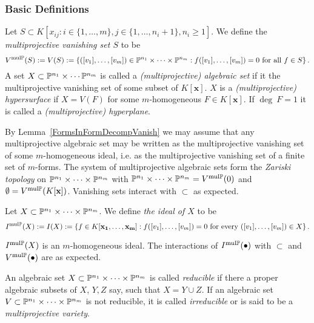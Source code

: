     \subsubsection{Basic Definitions}
        \begin{definition}
            Let $S\subset K[x_{ij} : i\in \{1,\dots,m\}, j\in \{1,\dots,n_i+1\}, n_i\geq 1]$. We define the \textit{multiprojective vanishing set $S$} to be 
            $$V^{{\mathrm{mul}\mathbb{P}}}(S):=V(S):=\left\{ ([v_1],\dots,[v_m])\in \mathbb{P}^{n_1}\times\cdots \times \mathbb{P}^{n_m} : f([v_1],\dots,[v_m])=0 \text{ for all } f\in S\right\}.$$
            A set $X\subset \mathbb{P}^{n_1}\times \cdots \mathbb{P}^{n_m}$ is called a \textit{(multiprojective) algebraic set} if it the multiprojective vanishing set of some subset of $K[\mathbf{x}]$. $X$ is a \textit{(multiprojective) hypersurface} if $X=V(F)$ for some $m$-homogeneous $F\in K[\mathbf{x}]$. If $\deg \ F = 1$ it is called a \textit{(multiprojective) hyperplane}.    
        \end{definition}
        \begin{remark}
            By Lemma~\ref{FormsInFormDecompVanish} we may assume that any multiprojective algebraic set may be written as the multiprojective vanishing set of some $m$-homogeneous ideal, i.e. as the multiprojective vanishing set of a finite set of $m$-forms. The system of multiprojective algebraic sets form the \textit{Zariski topology} on $\mathbb{P}^{n_1}\times \cdots \times \mathbb{P}^{n_m}$ with $\mathbb{P}^{n_1}\times\cdots\times \mathbb{P}^{n_m} = V^{{\mathrm{mul}\mathbb{P}}}(0)$ and $\emptyset = V^{\mathrm{mul}\mathbb{P}}(K[\mathbf{x}])$. Vanishing sets interact with $\subset$ as expected. 
        \end{remark}
        \begin{definition}
            Let $X\subset \mathbb{P}^{n_1}\times \cdots \times \mathbb{P}^{n_m}$. We define \textit{the ideal of $X$} to be 
            $$I^{\mathrm{mul}\mathbb{P}}(X) := I(X) := \left\{ f\in K[\mathbf{x_1},\dots,\mathbf{x_m}] : f([v_1],\dots,[v_m])=0 \text{ for every } ([v_1],\dots,[v_m])\in X\right\}.$$
        \end{definition}
        \begin{remark}
            $I^{\mathrm{mul}\mathbb{P}}(X)$ is an $m$-homogeneous ideal. The interactions of $I^{\mathrm{mul}\mathbb{P}}(\bullet)$ with $\subset$ and $V^{\mathrm{mul}\mathbb{P}}(\bullet)$ are as expected. 
        \end{remark}
        \begin{definition}
            An algebraic set $X\subset \mathbb{P}^{n_1}\times \cdots \times \mathbb{P}^{n_m}$ is called \textit{reducible} if there a proper algebraic subsets of $X$, $Y,Z$ say, such that $X = Y \cup Z$. If an algebraic set $V\subset \mathbb{P}^{n_1}\times \cdots \times \mathbb{P}^{n_m}$ is not reducible, it is called \textit{irreducible} or is said to be a \textit{multiprojective variety}.
        \end{definition}
